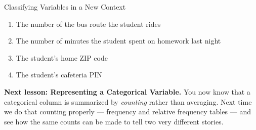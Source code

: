 \documentclass[12pt]{article}
\newcommand{\answerspace}[2]{\par\nopagebreak\noindent\begin{minipage}[t][#1][t]{\linewidth}%
  \color{keyred}\bfseries #2\end{minipage}\par}
\begin{document}
\begin{notesbox}{Classifying Variables in a New Context}
\begin{enumerate}[leftmargin=1.9em, itemsep=7pt]
\begin{enumerate}[label=\textbf{(\Alph*)}, leftmargin=2.2em, itemsep=3pt]
          \item The number of the bus route the student rides
          \item The number of minutes the student spent on homework last night
          \item The student's home ZIP code
          \item The student's cafeteria PIN
                \hfill{}
        \end{enumerate}
        \answerspace{2.15in}{\normalcolor\mdseries\gradedblank[id=hw5j, type=rubric, points=1,
          display={(C). Minutes are a measured amount, so 90 minutes really is twice
        45. The other four are labels written in digits.}]{\linewidth}{2.5cm}}
\end{enumerate}
\end{notesbox}

\vspace{0.12in}

\boxguard[10]
\begin{spiralbox}
\small
\textbf{Next lesson: Representing a Categorical Variable.} You now know that a categorical
column is summarized by \emph{counting} rather than averaging. Next time we do that counting
properly --- frequency and relative frequency tables --- and see how the same counts can be
made to tell two very different stories.
\end{spiralbox}
\end{document}
